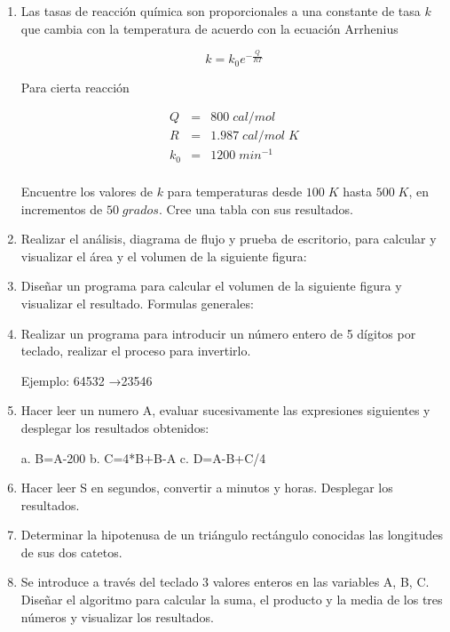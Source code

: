 \documentclass{scrartcl}
\begin{document}
\begin{enumerate}
		\item Las tasas de reacción química son proporcionales a una constante de tasa $k$ que cambia con la temperatura de acuerdo con la ecuación Arrhenius
		
		\begin{equation*}
			k = k_{0} e^{-\frac{Q}{RT}}
		\end{equation*}
	
		Para cierta reacción
		
		\begin{eqnarray*}
			Q  &=&	800\;cal/mol \\
			R  &=&  1.987\;cal/mol\;K \\
			k_{0} &=& 1200\;min^{-1} \\
		\end{eqnarray*}
	
		Encuentre los valores de $k$ para temperaturas desde $100\;K$ hasta $500\;K$, en incrementos de $50\;grados$. Cree una tabla con sus resultados.
		
		\item Realizar el análisis, diagrama de flujo y prueba de escritorio, para calcular y visualizar el área y el volumen de la siguiente figura:
		
		\item Diseñar un programa para calcular el volumen de la siguiente figura y visualizar el resultado. Formulas generales:
		
		\item Realizar un programa para introducir un número entero de 5 dígitos por teclado, realizar el proceso para invertirlo.
		
		Ejemplo: 64532 →23546
		
		\item Hacer leer un numero A, evaluar sucesivamente las expresiones siguientes y desplegar los resultados obtenidos:
		
		a. B=A-200
		b. C=4*B+B-A
		c. D=A-B+C/4
		
		
		\item Hacer leer S en segundos, convertir a minutos y horas. Desplegar los resultados.
		
		\item Determinar la hipotenusa de un triángulo rectángulo conocidas las longitudes de sus dos catetos.
		
		\item Se introduce a través del teclado 3 valores enteros en las variables A, B, C. Diseñar el algoritmo para calcular la suma, el producto y la media de los tres números y visualizar los resultados.
		

\end{enumerate}
\end{document}
